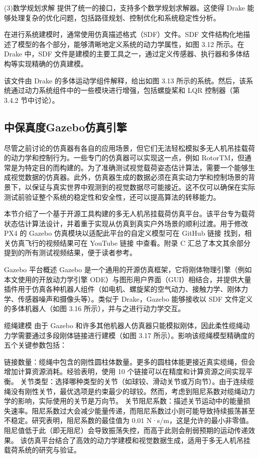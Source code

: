 \documentclass[lang=chs, degree=master, blindreview=false, winfonts=true]{yanputhesis}
\begin{document}
(3)数学规划求解
提供了统一的接口，支持多个数学规划求解器。这使得 Drake 能够处理复杂的优化问题，包括路径规划、控制优化和系统稳定性分析。

在进行系统建模时，通常使用仿真描述格式（SDF）文件。SDF 文件结构化地描述了模型的各个部分，能够清晰地定义系统的动力学属性，如图 3.12 所示。在 Drake 中，SDF 文件是建模的主要工具之一，通过定义传感器、执行器和多体结构等实现精确的仿真建模。


该文件由 Drake 的多体运动学组件解释，给出如图 3.13 所示的系统。然后，该系统通过动力系统组件中的一些模块进行增强，包括螺旋桨和 LQR 控制器（第 3.4.2 节中讨论）。



\subsection{中保真度Gazebo仿真引擎}
尽管之前讨论的仿真器有各自的应用场景，但它们无法轻松模拟多无人机吊挂载荷的动力学和控制行为。一些专门的仿真器可以实现这一点，例如 RotorTM，但通常是为特定目的而构建的。为了准确测试视觉载荷姿态估计算法，需要一个能够生成视觉数据的仿真器。此外，仿真器生成的数据必须在真实动力学和控制场景的背景下，以保证与真实世界中观测到的视觉数据尽可能接近。这不仅可以确保在实际测试前验证整个系统的稳定性和安全性，还可以提高算法的转移能力。

本节介绍了一个基于开源工具构建的多无人机吊挂载荷仿真平台。该平台专为载荷状态估计算法设计，并着重于实现从仿真到真实户外场景的顺利过渡。用于修改 PX4 的 Gazebo 仿真模块以适配此平台的自定义模型可在 GitHub 链接 找到，相关仿真飞行的视频结果可在 YouTube 链接 中查看。附录 C 汇总了本文其余部分提到的所有测试视频结果，便于读者参考。

Gazebo 平台概述
Gazebo 是一个通用的开源仿真框架，它将刚体物理引擎（例如本文使用的开放动力学引擎 ODE）与图形用户界面（GUI）相结合，并提供大量插件用于仿真各种机器人组件（如电机、螺旋桨的空气动力、接触力学、刚体力学、传感器噪声和摄像头等）。类似于 Drake，Gazebo 能够接收以 SDF 文件定义的多体机器人（如图 3.16 所示），并与之进行动力学交互。

缆绳建模
由于 Gazebo 和许多其他机器人仿真器只能模拟刚体，因此柔性缆绳动力学需要通过多段刚体链接进行建模（如图 3.17 所示）。影响该缆绳模型精确度的五个关键参数包括：

链接数量：缆绳中包含的刚性圆柱体数量。更多的圆柱体能更接近真实缆绳，但会增加计算资源消耗。经验表明，使用 10 个链接可以在精度和计算资源之间实现平衡。
关节类型：选择哪种类型的关节（如球铰、滑动关节或万向节）。由于连续缆绳没有刚性关节，最优选项是约束最少的球铰。然而，考虑到阻尼系数对缆绳动力学的影响，实际使用的关节是万向节。
关节阻尼系数：描述关节运动中的能量损失速率。阻尼系数过大会减少能量传递，而阻尼系数过小则可能导致持续振荡甚至不稳定。研究表明，阻尼系数的最佳值为 0.01 N·s/m，这是允许的最小非零值。阻尼值低于此（即无阻尼）会导致振荡失控，而高于此则会削弱预期的运动传递效果。
该仿真平台结合了高效的动力学建模和视觉数据生成，适用于多无人机吊挂载荷系统的研究与验证。
\end{document}
